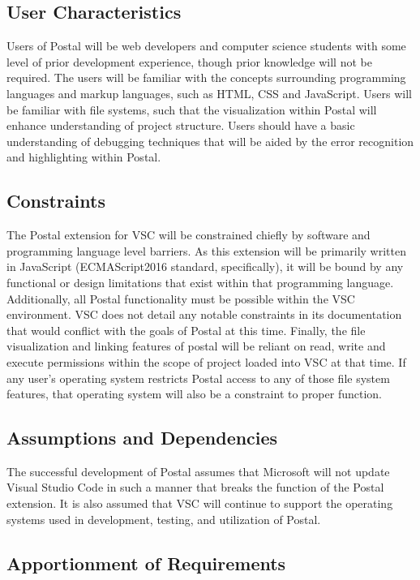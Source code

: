 \documentclass[letterpaper,10pt,titlepage,draftclsnofoot,onecolumn] {IEEEtran}
\begin{document}
\subsection{User Characteristics}
Users of Postal will be web developers and computer science students with some level of prior development experience, though prior knowledge will not be required. The users will be familiar with the concepts surrounding programming languages and markup languages, such as HTML, CSS and JavaScript. Users will be familiar with file systems, such that the visualization within Postal will enhance understanding of project structure. Users should have a basic understanding of debugging techniques that will be aided by the error recognition and highlighting within Postal.

\subsection{Constraints}
The Postal extension for VSC will be constrained chiefly by software and programming language level barriers. As this extension will be primarily written in JavaScript (ECMAScript2016 standard, specifically), it will be bound by any functional or design limitations that exist within that programming language. Additionally, all Postal functionality must be possible within the VSC environment. VSC does not detail any notable constraints in its documentation that would conflict with the goals of Postal at this time. Finally, the file visualization and linking features of postal will be reliant on read, write and execute permissions within the scope of project loaded into VSC at that time. If any user's operating system restricts Postal access to any of those file system features, that operating system will also be a constraint to proper function.

\subsection{Assumptions and Dependencies}
The successful development of Postal assumes that Microsoft will not update Visual Studio Code in such a manner that breaks the function of the Postal extension. It is also assumed that VSC will continue to support the operating systems used in development, testing, and utilization of Postal.

\subsection{Apportionment of Requirements}
\end{document}

